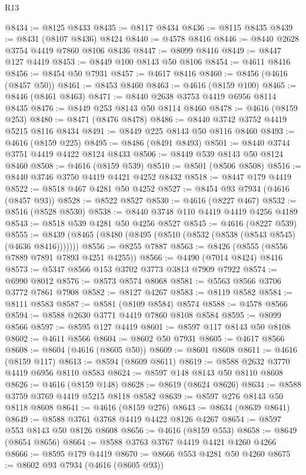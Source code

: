 \begin{lexlean}{R13}
\begin{coremodule}
@8434 := @8125 @8433
@8435 := @8117 @8434
@8436 := @8115 @8435
@8439 := @8431 (@8107 @8436) @8424
@8440 := @4578 @8416
@8446 := @8440 @2628 @3754 @4419 @7860 @8106 @8436
@8447 := @8099 @8416
@8449 := @8447 @127 @4419
@8453 := @8449 @100 @8143 @50 @8106
@8454 := @4611 @8416
@8456 := @8454 @50 @7931
@8457 := @4617 @8416
@8460 := @8456 (@4616 (@8457 @50))
@8461 := @8453 @8460
@8463 := @4616 (@8159 @100)
@8465 := @8446 (@8461 @8463)
@8471 := @8440 @2638 @3753 @4419 @6956 @8114 @8435
@8476 := @8449 @253 @8143 @50 @8114 @8460
@8478 := @4616 (@8159 @253)
@8480 := @8471 (@8476 @8478)
@8486 := @8440 @3742 @3752 @4419 @5215 @8116 @8434
@8491 := @8449 @225 @8143 @50 @8116 @8460
@8493 := @4616 (@8159 @225)
@8495 := @8486 (@8491 @8493)
@8501 := @8440 @3744 @3751 @4419 @4422 @8124 @8433
@8506 := @8449 @539 @8143 @50 @8124 @8460
@8508 := @4616 (@8159 @539)
@8510 := @8501 (@8506 @8508)
@8516 := @8440 @3746 @3750 @4419 @4421 @4252 @8432
@8518 := @8447 @179 @4419
@8522 := @8518 @467 @4281 @50 @4252
@8527 := @8454 @93 @7934 (@4616 (@8457 @93))
@8528 := @8522 @8527
@8530 := @4616 (@8227 @467)
@8532 := @8516 (@8528 @8530)
@8538 := @8440 @3748 @110 @4419 @4419 @4256 @4189
@8543 := @8518 @539 @4281 @50 @4256 @8527
@8545 := @4616 (@8227 @539)
@8555 := @8439 (@8465 (@8480 (@8495 (@8510 (@8532 (@8538 (@8543 @8545) (@4636 @8416)))))))
@8556 := @8255 @7887
@8563 := @8426 (@8555 (@8556 @7889 @7891 @7893 @4251 @4255))
@8566 := @4490 (@7014 @8424) @8416
@8573 := @5347 @8566 @153 @3702 @3773 @3813 @7909 @7922
@8574 := @6990 @8012
@8576 := @8573 @8574 @8068
@8581 := @5563 @8566 @3706 @3772 @7861 @7908
@8582 := @8127 @4267
@8583 := @8119 @8582
@8584 := @8111 @8583
@8587 := @8581 (@8109 @8584) @8574
@8588 := @4578 @8566
@8594 := @8588 @2630 @3771 @4419 @7860 @8108 @8584
@8595 := @8099 @8566
@8597 := @8595 @127 @4419
@8601 := @8597 @117 @8143 @50 @8108
@8602 := @4611 @8566
@8604 := @8602 @50 @7931
@8605 := @4617 @8566
@8608 := @8604 (@4616 (@8605 @50))
@8609 := @8601 @8608
@8611 := @4616 (@8159 @117)
@8613 := @8594 (@8609 @8611)
@8619 := @8588 @2632 @3770 @4419 @6956 @8110 @8583
@8624 := @8597 @148 @8143 @50 @8110 @8608
@8626 := @4616 (@8159 @148)
@8628 := @8619 (@8624 @8626)
@8634 := @8588 @3759 @3769 @4419 @5215 @8118 @8582
@8639 := @8597 @276 @8143 @50 @8118 @8608
@8641 := @4616 (@8159 @276)
@8643 := @8634 (@8639 @8641)
@8649 := @8588 @3761 @3768 @4419 @4422 @8126 @4267
@8654 := @8597 @553 @8143 @50 @8126 @8608
@8656 := @4616 (@8159 @553)
@8658 := @8649 (@8654 @8656)
@8664 := @8588 @3763 @3767 @4419 @4421 @4260 @4266
@8666 := @8595 @179 @4419
@8670 := @8666 @553 @4281 @50 @4260
@8675 := @8602 @93 @7934 (@4616 (@8605 @93))

\end{coremodule}
\end{lexlean}
